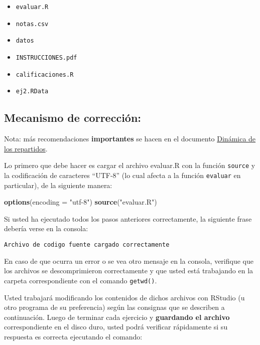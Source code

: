 \documentclass[]{article}
\newenvironment{Shaded}{}{}
\newcommand{\KeywordTok}[1]{\textcolor[rgb]{0.00,0.44,0.13}{\textbf{{#1}}}}
\newcommand{\DataTypeTok}[1]{\textcolor[rgb]{0.56,0.13,0.00}{{#1}}}
\newcommand{\StringTok}[1]{\textcolor[rgb]{0.25,0.44,0.63}{{#1}}}
\newcommand{\NormalTok}[1]{{#1}}
\begin{document}
\begin{itemize}
\item
  \texttt{evaluar.R}
\item
  \texttt{notas.csv}
\item
  \texttt{datos}
\item
  \texttt{INSTRUCCIONES.pdf}
\item
  \texttt{calificaciones.R}
\item
  \texttt{ej2.RData}
\end{itemize}
\subsection{Mecanismo de corrección:}

Nota: más recomendaciones \textbf{importantes} se hacen en el documento
\href{http://goo.gl/P5Wnq}{Dinámica de los repartidos}.

Lo primero que debe hacer es cargar el archivo evaluar.R con la función
\texttt{source} y la codificación de caracteres ``UTF-8'' (lo cual
afecta a la función \texttt{evaluar} en particular), de la siguiente
manera:

\begin{Shaded}
\begin{Highlighting}[]
\KeywordTok{options}\NormalTok{(}\DataTypeTok{encoding =} \StringTok{"utf-8"}\NormalTok{)}
\KeywordTok{source}\NormalTok{(}\StringTok{"evaluar.R"}\NormalTok{)}
\end{Highlighting}
\end{Shaded}
Si usted ha ejecutado todos los pasos anteriores correctamente, la
siguiente frase debería verse en la consola:

\begin{verbatim}
Archivo de codigo fuente cargado correctamente
\end{verbatim}
En caso de que ocurra un error o se vea otro mensaje en la consola,
verifique que los archivos se descomprimieron correctamente y que usted
está trabajando en la carpeta correspondiente con el comando
\texttt{getwd()}.

Usted trabajará modificando los contenidos de dichos archivos con
RStudio (u otro programa de su preferencia) según las consignas que se
describen a continuación. Luego de terminar cada ejercicio y
\textbf{guardando el archivo} correspondiente en el disco duro, usted
podrá verificar rápidamente si su respuesta es correcta ejecutando el
comando:
\end{document}

